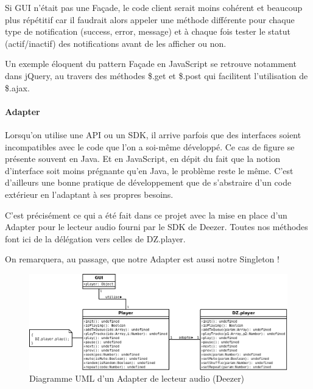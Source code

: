 \documentclass[a4paper,12pt]{article}
\begin{document}
Si GUI n'était pas une Façade, le code client serait moins cohérent et beaucoup plus répétitif car il faudrait alors appeler une méthode différente pour chaque type de notification (success, error, message) et à chaque fois tester le statut (actif/inactif) des notifications avant de les afficher ou non.

Un exemple éloquent du pattern Façade en JavaScript se retrouve notamment dans jQuery, au travers des méthodes \$.get et \$.post qui facilitent l'utilisation de \$.ajax.

\newpage

\paragraph{Adapter}

Lorsqu'on utilise une API ou un SDK, il arrive parfois que des interfaces soient incompatibles avec le code que l'on a soi-même développé. Ce cas de figure se présente souvent en Java. Et en JavaScript, en dépit du fait que la notion d'interface soit moins prégnante qu'en Java, le problème reste le même. C'est d'ailleurs une bonne pratique de développement que de s'abstraire d'un code extérieur en l'adaptant à ses propres besoins.

C'est précisément ce qui a été fait dans ce projet avec la mise en place d'un Adapter pour le lecteur audio fourni par le SDK de Deezer. Toutes nos méthodes font ici de la délégation vers celles de DZ.player.

On remarquera, au passage, que notre Adapter est aussi notre Singleton !

\vspace{10pt}

\begin{figure}[!h]
  \begin{center}
    \includegraphics[scale=0.35]{Adapter.png}
    \caption{Diagramme UML d'un Adapter de lecteur audio (Deezer)}
  \end{center}
\end{figure}
\end{document}
